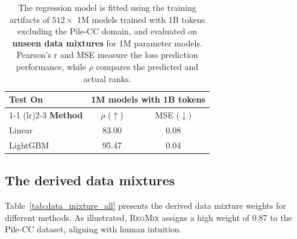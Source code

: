 \documentclass{article}
\theoremstyle{definition}
\theoremstyle{remark}
\newcommand{\ourmethod}{\textsc{RegMix}\xspace}
\begin{document}
\begin{table}[htbp]
    \centering
    \small
    \caption{The regression model is fitted using the training artifacts of $512 \times$ 1M models trained with 1B tokens excluding the Pile-CC domain, and evaluated on \textbf{unseen data mixtures} for 1M parameter models. Pearson's r and MSE measure the loss prediction performance, while $\rho$ compares the predicted and actual ranks.}
    \label{tab:linear_vs_lightgbm_1M_OOD}
    \begin{tabular}{lcc}
        \toprule
        {Test On} & \multicolumn{2}{c}{1M models with 1B tokens}\\
        \cmidrule(r){1-1} \cmidrule(lr){2-3}
        \textbf{Method} & $\rho$ ($\uparrow$) & MSE ($\downarrow$) \\
        \midrule
        Linear  & 83.00  & 0.08  \\
        LightGBM & {95.47} & {0.04} \\
        \bottomrule
    \end{tabular}
\end{table}

\subsection{The derived data mixtures}

Table~\ref{tab:data_mixture_all} presents the derived data mixture weights for different methods. As illustrated, \ourmethod assigns a high weight of 0.87 to the Pile-CC dataset, aligning with human intuition.
\end{document}
